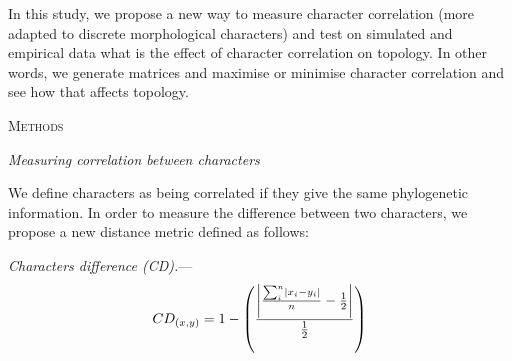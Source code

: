 \documentclass[12pt,letterpaper]{article}
\DeclarePairedDelimiter\abs{\lvert}{\rvert}%
\renewcommand{\section}[1]{%
\bigskip
\begin{center}
\begin{Large}
\normalfont\scshape #1
\medskip
\end{Large}
\end{center}}
\renewcommand{\subsection}[1]{%
\bigskip
\begin{center}
\begin{large}
\normalfont\itshape #1
\end{large}
\end{center}}
\renewcommand{\subsubsection}[1]{%
\vspace{2ex}
\noindent
\textit{#1.}---}
\begin{document}

In this study, we propose a new way to measure character correlation (more adapted to discrete morphological characters) and test on simulated and empirical data what is the effect of character correlation on topology. %
In other words, we generate matrices and maximise or minimise character correlation and see how that affects topology.


\section{Methods}

\subsection{Measuring correlation between characters}

We define characters as being correlated if they give the same phylogenetic information.
In order to measure the difference between two characters, we propose a new distance metric defined as follows:

\subsubsection{Characters difference (CD)}
\begin{equation}
    CD_{(x,y)} = 1 - \left(\frac{\abs*{\frac{\sum_{i}^{n}\abs{x_{i} - y_{i}}}{n}-\frac{1}{2}}}{\frac{1}{2}}\right)
\end{equation}
\end{document}

